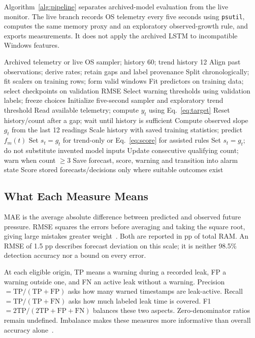 \documentclass{llncs}
\begin{document}
Algorithm~\ref{alg:pipeline} separates archived-model evaluation from the live monitor. The live branch records OS telemetry every five seconds using \texttt{psutil}, computes the same memory proxy and an exploratory observed-growth rule, and exports measurements. It does not apply the archived LSTM to incompatible Windows features.
\begin{algorithm}[t]
\caption{Telemetry forecasting and causal warning generation}
\label{alg:pipeline}
\begin{algorithmic}[1]
\Require Archived telemetry or live OS sampler; history 60; trend history 12
  \State Align past observations; derive rates; retain gaps and label provenance
  \State Split chronologically; fit scalers on training rows; form valid windows
  \State Fit predictors on training data; select checkpoints on validation RMSE
  \State Select warning thresholds using validation labels; freeze choices
\Else
  \State Initialize five-second sampler and exploratory trend threshold
\EndIf
{}
  \State Read available telemetry; compute $y_t$ using Eq.~\ref{eq:target}
  \State Reset history/count after a gap; wait until history is sufficient
  \State Compute observed slope $g_t$ from the last 12 readings
    \State Scale history with saved training statistics; predict $f_m(t)$
    \State Set $s_t=g_t$ for trend-only or Eq.~\ref{eq:score} for assisted rules
  \Else
    \State Set $s_t=g_t$; do not substitute invented model inputs
  \EndIf
  \State Update consecutive qualifying count; warn when count $\geq3$
  \State Save forecast, score, warning and transition into alarm state
\EndFor
\State Score stored forecasts/decisions only where suitable outcomes exist
\end{algorithmic}
\end{algorithm}

\subsection{What Each Measure Means}
MAE is the average absolute difference between predicted and observed future pressure. RMSE squares the errors before averaging and taking the square root, giving large mistakes greater weight~\cite{ref41}. Both are reported in pp of total RAM. An RMSE of 1.5 pp describes forecast deviation on this scale; it is neither 98.5\% detection accuracy nor a bound on every error.

At each eligible origin, TP means a warning during a recorded leak, FP a warning outside one, and FN an active leak without a warning. Precision $=\mathrm{TP}/(\mathrm{TP+FP})$ asks how many warned timestamps are leak-active. Recall $=\mathrm{TP}/(\mathrm{TP+FN})$ asks how much labeled leak time is covered. F1 $=2\mathrm{TP}/(2\mathrm{TP+FP+FN})$ balances these two aspects. Zero-denominator ratios remain undefined. Imbalance makes these measures more informative than overall accuracy alone~\cite{ref42}.
\end{document}
